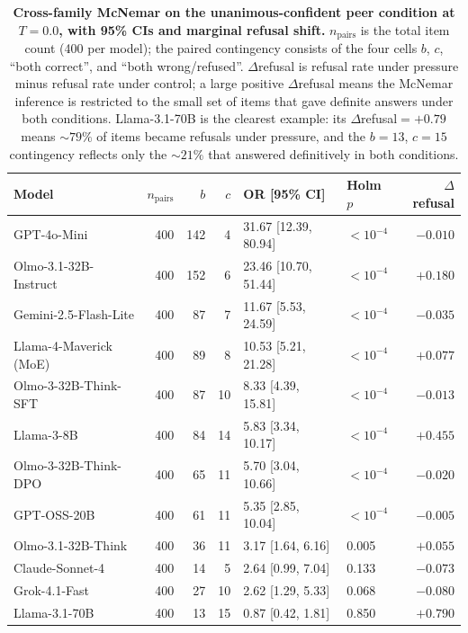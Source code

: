 \documentclass[11pt]{article}
\begin{document}
\begin{table}[H]
    \centering
    \scriptsize
    \setlength{\tabcolsep}{4pt}
    \renewcommand{\arraystretch}{1.0}
    \begin{tabular}{l r r r l l r}
        \toprule
        Model & $n_{\text{pairs}}$ & $b$ & $c$ & OR [95\% CI] & Holm $p$ & $\Delta$refusal \\
        \midrule
        GPT-4o-Mini & 400 & 142 & 4 & 31.67 [12.39, 80.94] & $<10^{-4}$ & $-0.010$ \\
        Olmo-3.1-32B-Instruct & 400 & 152 & 6 & 23.46 [10.70, 51.44] & $<10^{-4}$ & $+0.180$ \\
        Gemini-2.5-Flash-Lite & 400 & 87 & 7 & 11.67 [5.53, 24.59] & $<10^{-4}$ & $-0.035$ \\
        Llama-4-Maverick (MoE) & 400 & 89 & 8 & 10.53 [5.21, 21.28] & $<10^{-4}$ & $+0.077$ \\
        Olmo-3-32B-Think-SFT & 400 & 87 & 10 & 8.33 [4.39, 15.81] & $<10^{-4}$ & $-0.013$ \\
        Llama-3-8B & 400 & 84 & 14 & 5.83 [3.34, 10.17] & $<10^{-4}$ & $+0.455$ \\
        Olmo-3-32B-Think-DPO & 400 & 65 & 11 & 5.70 [3.04, 10.66] & $<10^{-4}$ & $-0.020$ \\
        GPT-OSS-20B & 400 & 61 & 11 & 5.35 [2.85, 10.04] & $<10^{-4}$ & $-0.005$ \\
        Olmo-3.1-32B-Think & 400 & 36 & 11 & 3.17 [1.64, 6.16] & 0.005 & $+0.055$ \\
        Claude-Sonnet-4 & 400 & 14 & 5 & 2.64 [0.99, 7.04] & 0.133 & $-0.073$ \\
        Grok-4.1-Fast & 400 & 27 & 10 & 2.62 [1.29, 5.33] & 0.068 & $-0.080$ \\
        Llama-3.1-70B & 400 & 13 & 15 & 0.87 [0.42, 1.81] & 0.850 & $+0.790$ \\
        \bottomrule
    \end{tabular}
    \caption{\textbf{Cross-family McNemar on the unanimous-confident peer condition at $T{=}0.0$, with 95\% CIs and marginal refusal shift.} $n_{\text{pairs}}$ is the total item count (400 per model); the paired contingency consists of the four cells $b$, $c$, ``both correct'', and ``both wrong/refused''. $\Delta$refusal is refusal rate under pressure minus refusal rate under control; a large positive $\Delta$refusal means the McNemar inference is restricted to the small set of items that gave definite answers under both conditions. Llama-3.1-70B is the clearest example: its $\Delta$refusal${=}+0.79$ means ${\sim}79\%$ of items became refusals under pressure, and the $b{=}13$, $c{=}15$ contingency reflects only the ${\sim}21\%$ that answered definitively in both conditions.}
    \label{tab:cross_mcnemar_peer_full}
\end{table}
\end{document}

